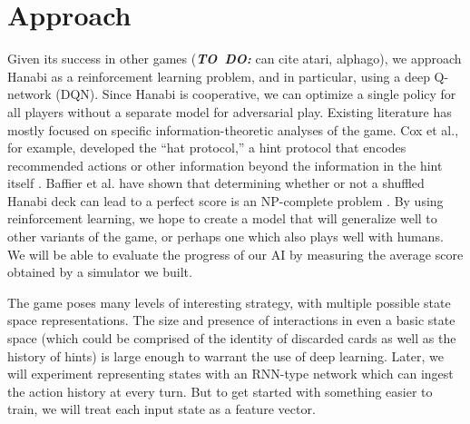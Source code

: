 \documentclass{article}
\newcommand{\todo}{\textbf{\textit{TO~DO: }}}
\begin{document}
\section{Approach}

Given its success in other games (\todo can cite atari, alphago), we approach Hanabi as a reinforcement learning problem, and in particular, using a deep Q-network (DQN). Since Hanabi is cooperative, we can optimize a single policy for all players without a separate model for adversarial play. Existing literature has mostly focused on specific information-theoretic analyses of the game. Cox et al., for example, developed the “hat protocol,” a hint protocol that encodes recommended actions or other information beyond the information in the hint itself \cite{cox15}. Baffier et al. have shown that determining whether or not a shuffled Hanabi deck can lead to a perfect score is an NP-complete problem \cite{baffier16}. By using reinforcement learning, we hope to create a model that will generalize well to other variants of the game, or perhaps one which also plays well with humans. We will be able to evaluate the progress of our AI by measuring the average score obtained by a simulator we built.

The game poses many levels of interesting strategy, with multiple possible state space representations. The size and presence of interactions in even a basic state space (which could be comprised of the identity of discarded cards as well as the history of hints) is large enough to warrant the use of deep learning. Later, we will experiment representing states with an RNN-type network which can ingest the action history at every turn. But to get started with something easier to train, we will treat each input state as a feature vector.
\end{document}
